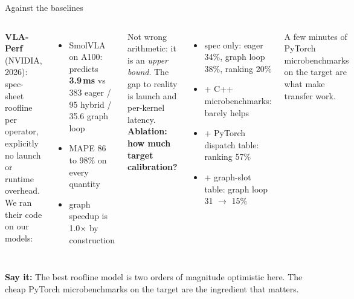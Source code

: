 \documentclass[aspectratio=169,10pt]{beamer}
\newcommand{\say}[1]{\par\vfill\noindent\colorbox{soft}{\parbox{\dimexpr\textwidth-2\fboxsep\relax}{\small\textbf{\textcolor{accent}{Say it:}} #1}}}
\begin{document}
\begin{frame}{Against the baselines}
\begin{columns}[T]
\textbf{VLA-Perf} (NVIDIA, 2026): spec-sheet roofline per operator, explicitly no launch or
runtime overhead. We ran their code on our models:
\begin{itemize}\small
\item SmolVLA on A100: predicts \textbf{3.9\,ms} vs 383 eager / 95 hybrid / 35.6 graph loop
\item MAPE 86 to 98\% on every quantity
\item graph speedup is 1.0$\times$ by construction
\end{itemize}
Not wrong arithmetic: it is an \emph{upper bound}. The gap to reality is launch and
per-kernel latency.
\textbf{Ablation: how much target calibration?}
\begin{itemize}\small
\item spec only: eager 34\%, graph loop 38\%, ranking 20\%
\item + C++ microbenchmarks: barely helps
\item + PyTorch dispatch table: ranking 57\%
\item + graph-slot table: graph loop 31 $\rightarrow$ 15\%
\end{itemize}
A few minutes of PyTorch microbenchmarks on the target are what make transfer work.
\end{columns}
\say{The best roofline model is two orders of magnitude optimistic here. The cheap PyTorch
microbenchmarks on the target are the ingredient that matters.}
\end{frame}
\end{document}
